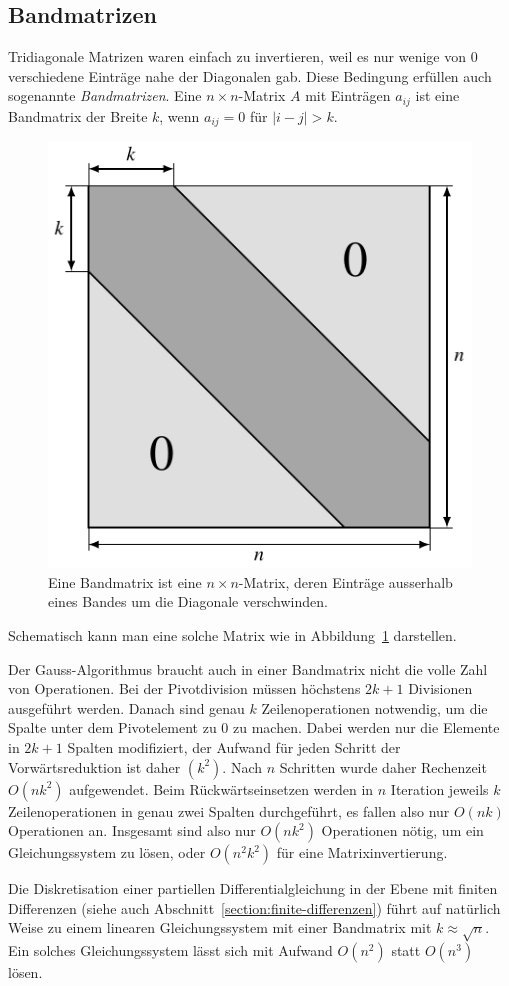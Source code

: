 \subsection{Bandmatrizen}
Tridiagonale Matrizen waren einfach zu invertieren, weil es nur wenige
von $0$ verschiedene Einträge nahe der Diagonalen gab.
Diese Bedingung erfüllen auch sogenannte {\em Bandmatrizen}.
Eine $n\times n$-Matrix $A$ mit Einträgen $a_{ij}$ ist eine Bandmatrix
der Breite $k$, wenn $a_{ij} = 0$ für $|i-j|>k$.
\begin{figure}
\centering
\includegraphics{chapters/60-linsys/images/bandmatrix.pdf}
\caption{Eine Bandmatrix ist eine $n\times n$-Matrix, deren Einträge
ausserhalb eines Bandes um die Diagonale verschwinden.
\label{buch:figure:bandmatrix}}
\end{figure}
Schematisch kann man eine solche Matrix wie in
Abbildung~\ref{buch:figure:bandmatrix} darstellen.

Der Gauss-Algorithmus braucht auch in einer Bandmatrix nicht die
volle Zahl von Operationen.
Bei der Pivotdivision müssen höchstens $2k+1$ Divisionen ausgeführt
werden.
Danach sind genau $k$ Zeilenoperationen notwendig, um die Spalte
unter dem Pivotelement zu $0$ zu machen.
Dabei werden nur die Elemente in $2k+1$ Spalten modifiziert,
der Aufwand für jeden Schritt der Vorwärtsreduktion ist daher $(k^2)$.
Nach $n$ Schritten wurde daher Rechenzeit $O(nk^2)$ aufgewendet.
Beim Rückwärtseinsetzen werden in $n$ Iteration jeweils $k$ Zeilenoperationen
in genau zwei Spalten durchgeführt, es fallen also nur $O(nk)$
Operationen an.
Insgesamt sind also nur $O(nk^2)$ Operationen nötig, um ein Gleichungssystem
zu lösen, oder $O(n^2k^2)$ für eine Matrixinvertierung.

Die Diskretisation einer partiellen Differentialgleichung in der Ebene
mit finiten Differenzen
(siehe auch Abschnitt~\ref{section:finite-differenzen})
führt auf natürlich Weise zu einem linearen
Gleichungssystem mit einer Bandmatrix mit $k\approx \sqrt{n}$.
Ein solches Gleichungssystem lässt sich mit Aufwand $O(n^2)$ statt 
$O(n^3)$ lösen.







